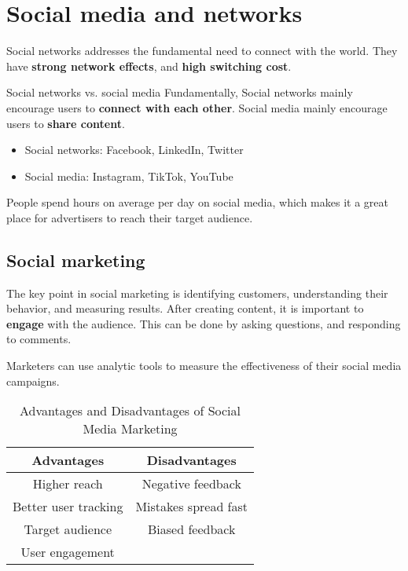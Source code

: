 \section{Social media and networks}

Social networks addresses the fundamental need to connect with the world. They have \textbf{strong network effects}, and \textbf{high switching cost}.

\begin{knBox}
    {Social networks vs. social media}
    Fundamentally, Social networks mainly encourage users to \textbf{connect with each other}. Social media mainly encourage users to \textbf{share content}.
    \begin{itemize}
        \item Social networks: Facebook, LinkedIn, Twitter
        \item Social media: Instagram, TikTok, YouTube
    \end{itemize}
\end{knBox}

People spend hours on average per day on social media, which makes it a great place for advertisers to reach their target audience.

\subsection{Social marketing}

The key point in social marketing is identifying customers, understanding their behavior, and measuring results. After creating content, it is important to \textbf{engage} with the audience. This can be done by asking questions, and responding to comments.

Marketers can use analytic tools to measure the effectiveness of their social media campaigns.

\begin{table}[h!]
    \centering
    \begin{tabular}{|c|c|}
        \hline
        \textbf{Advantages}  & \textbf{Disadvantages} \\
        \hline
        Higher reach         & Negative feedback      \\
        Better user tracking & Mistakes spread fast   \\
        Target audience      & Biased feedback        \\
        User engagement      &                        \\
        \hline
    \end{tabular}
    \caption{Advantages and Disadvantages of Social Media Marketing}
    \label{tab:advantages_disadvantages}
\end{table}

